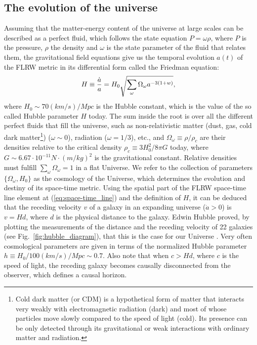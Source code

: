 \subsection{The evolution of the universe}
Assuming that the matter-energy content of the universe at large scales can be described as a perfect fluid, which follows the state equation $P = \omega \rho$, where $P$ is the pressure, $\rho$ the density and $\omega$ is the state parameter of the fluid that relates them, the gravitational field equations give us the temporal evolution $a(t)$ of the FLRW metric in its differential form called the Friedman equation:
\begin{equation}
H \equiv {\dot{a} \over a} = H_0\sqrt{\sum_\omega \Omega_{\omega}a^{-3(1+w)}},
\label{eq:friedman}
\end{equation} 
where $H_0 \sim 70 (km/s)/Mpc$ is the Hubble constant, which is the value of the so called Hubble parameter $H$ today. The sum inside the root is over all the different perfect fluids that fill the universe, such as non-relativistic matter (dust, gas, cold dark matter\footnote{Cold dark matter (or CDM) is a hypothetical form of matter that interacts very weakly with electromagnetic radiation (dark) and most of whose particles move slowly compared to the speed of light (cold). Its presence can be only detected through its gravitational or weak interactions with ordinary matter and radiation.}) ($\omega \sim 0$), radiation ($\omega=1/3$), etc., and $\Omega_\omega \equiv \rho / \rho_c$ are their densities relative to the critical density $\rho_c \equiv 3H^2_0 / 8\pi G$ today, where $G\sim6.67\cdot10^{-11}N\cdot(m/kg)^2$ is the gravitational constant. Relative densities must fulfill $\sum_\omega \Omega_\omega =1$ in a flat Universe. We refer to the collection of parameters $\lbrace \Omega_\omega, H_0 \rbrace$ as the cosmology of the Universe, which determines the evolution and destiny of its space-time metric. Using the spatial part of the FLRW space-time line element at (\ref{eq:space-time_line}) and the definition of $H$, it can be deduced that the receding velocity $v$ of a galaxy in an expanding universe ($\dot{a}>0$) is $v = Hd$, where $d$ is the physical distance to the galaxy. Edwin Hubble proved, by plotting the measurements of the distance and the receding velocity of 22 galaxies (see Fig.~\ref{fig:hubble_diagram}), that this is the case for our Universe \citep{Hubble1929}. Very often cosmological parameters are given in terms of the normalized Hubble parameter $h\equiv H_0/100(km/s)/Mpc\sim0.7$. Also note that when $c>Hd$, where $c$ is the speed of light, the receding galaxy becomes causally disconnected from the observer, which defines a causal horizon.
